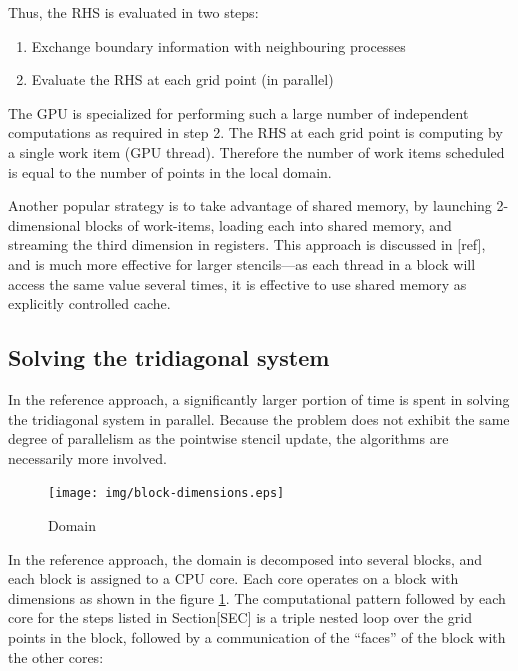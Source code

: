 \documentclass{article}
\begin{document}
        Thus, the RHS is evaluated in two steps:

        \begin{enumerate}
            \item Exchange boundary information with neighbouring processes
            \item Evaluate the RHS at each grid point (in parallel)
        \end{enumerate}

        The GPU is specialized for performing such a large number of independent
        computations as required in step 2.
        The RHS at each grid point is computing by a single work item
        (GPU thread).
        Therefore the number of work items scheduled is
        equal to the number of points in the local domain.

        Another popular strategy is to take advantage of
        shared memory, by launching 2-dimensional blocks of work-items,
        loading each into shared memory, and streaming the third dimension
        in registers.
        This approach is discussed in [ref], and is much more effective
        for larger stencils---as each thread in a block will access the same
        value several times, it is effective to use shared memory as explicitly
        controlled cache.

    \subsection{Solving the tridiagonal system}

        In the reference approach, a significantly larger portion of time is spent in solving
        the tridiagonal system in parallel.
        Because the problem does not exhibit the same degree of parallelism as
        the pointwise stencil update,
        the algorithms are necessarily more involved.

        \begin{figure}[h]
        \begin{center}
        \texttt{[image: img/block-dimensions.eps]}
        \end{center}
        \caption{Domain}
        \label{fig:block-dimensions}
        \end{figure}

        In the reference approach, the domain is decomposed into several blocks,
        and each block is assigned to a CPU core.
        Each core operates on a block with dimensions as shown
        in the figure \ref{fig:block-dimensions}.
        The computational pattern followed by each core for the steps listed in Section[SEC]
        is a triple nested loop over the grid points in the block,
        followed by a communication of the ``faces'' of the block with the other
        cores:
\end{document}
